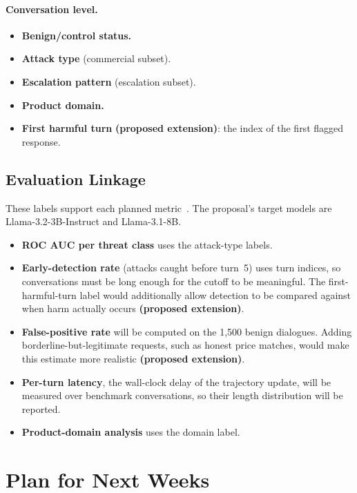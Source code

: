 \documentclass[sigconf,nonacm]{acmart}
\newcommand{\ext}{\textbf{(proposed extension)}}
\begin{document}
\paragraph{Conversation level.}
\begin{itemize}
  \item \textbf{Benign/control status.}
  \item \textbf{Attack type} (commercial subset).
  \item \textbf{Escalation pattern} (escalation subset).
  \item \textbf{Product domain.}
  \item \textbf{First harmful turn} \ext: the index of the first flagged response.
\end{itemize}

\subsection{Evaluation Linkage}

These labels support each planned metric~\cite{koshal2026cart}. The proposal's target models are Llama-3.2-3B-Instruct and Llama-3.1-8B.
\begin{itemize}
  \item \textbf{ROC AUC per threat class} uses the attack-type labels.
  \item \textbf{Early-detection rate} (attacks caught before turn~5) uses turn indices, so conversations must be long enough for the cutoff to be meaningful. The first-harmful-turn label would additionally allow detection to be compared against when harm actually occurs \ext.
  \item \textbf{False-positive rate} will be computed on the 1,500 benign dialogues. Adding borderline-but-legitimate requests, such as honest price matches, would make this estimate more realistic \ext.
  \item \textbf{Per-turn latency}, the wall-clock delay of the trajectory update, will be measured over benchmark conversations, so their length distribution will be reported.
  \item \textbf{Product-domain analysis} uses the domain label.
\end{itemize}

\section{Plan for Next Weeks}
\label{sec:plan}
\end{document}
